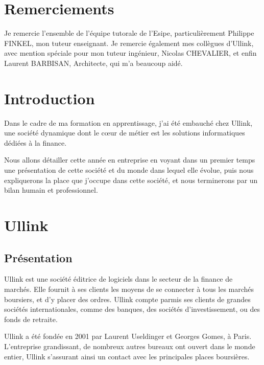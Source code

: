 \documentclass[a4paper, 12pt]{article}
\begin{document}

\pagebreak

\section*{Remerciements}
Je remercie l'ensemble de l'équipe tutorale de l'Esipe, particulièrement Philippe FINKEL, mon tuteur enseignant. Je remercie également mes collègues d'Ullink, avec mention spéciale pour mon tuteur ingénieur, Nicolas CHEVALIER, et enfin Laurent BARBISAN, Architecte, qui m'a beaucoup aidé.

\pagebreak
\tableofcontents
\pagebreak

\section*{Introduction}

Dans le cadre de ma formation en apprentissage, j'ai été embauché chez Ullink, une société dynamique dont le c\oe{}ur de métier est les solutions informatiques dédiées à la finance.

Nous allons détailler cette année en entreprise en voyant dans un premier temps une présentation de cette société et du monde dans lequel elle évolue, puis nous expliquerons la place que j'occupe dans cette société, et nous terminerons par un bilan humain et professionnel.
\pagebreak

\section{Ullink}
\subsection{Présentation}
Ullink est une société éditrice de logiciels dans le secteur de la finance de marchés. Elle fournit à ses clients les moyens de se connecter à tous les marchés boursiers, et d'y placer des ordres. Ullink compte parmis ses clients de grandes sociétés internationales, comme des banques, des sociétés d'investissement, ou des fonds de retraite.

Ullink a été fondée en 2001 par Laurent Useldinger et Georges Gomes, à Paris. L'entreprise grandissant, de nombreux autres bureaux ont ouvert dans le monde entier, Ullink s'assurant ainsi un contact avec les principales places boursières.
\end{document}
